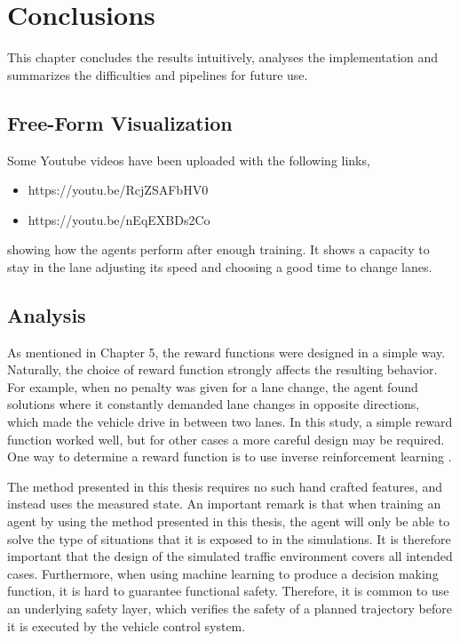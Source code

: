 \chapter{Conclusions}

This chapter concludes the results intuitively, analyses the implementation and summarizes the difficulties and pipelines for future use.

\section{Free-Form Visualization}

Some Youtube videos have been uploaded with the following links,

\begin{itemize}
	\item https://youtu.be/RcjZSAFbHV0 
	\item https://youtu.be/nEqEXBDs2Co 
\end{itemize}

showing how the agents perform after enough training. It shows a capacity to stay in the lane adjusting its speed and choosing a good time to change lanes.

\section{Analysis}

As mentioned in Chapter 5, the reward functions were designed in a simple way. Naturally, the choice of reward function strongly affects the resulting behavior. For example, when no penalty was given for a lane change, the agent found solutions where it constantly demanded lane changes in opposite directions, which made the vehicle drive in between two lanes. In this study, a simple reward function worked well, but for other cases a more careful design may be required. One way to determine a reward function is to use inverse reinforcement learning \cite{IRL}.

The method presented in this thesis requires no such hand crafted features, and instead uses the measured state. An important remark is that when training an agent by using the method presented in this thesis, the agent will only be able to solve the type of situations that it is exposed to in the simulations. It is therefore important that the design of the simulated traffic environment covers all intended cases. Furthermore, when using machine learning to produce a decision making function, it is hard to guarantee functional safety. Therefore, it is common to use an underlying safety layer, which verifies the safety of a planned trajectory before it is executed by the vehicle control system.

